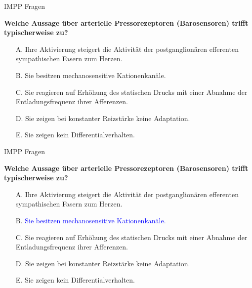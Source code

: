 \documentclass{beamer}
\begin{document}












\begin{frame}{IMPP Fragen}


\textbf{Welche Aussage über arterielle Pressorezeptoren (Barosensoren) trifft typischerweise zu?} \\[0.2 cm]

\begin{itemize}
\item[A.] Ihre Aktivierung steigert die Aktivität der postganglionären efferenten sympathischen Fasern zum Herzen.
\item[B.] Sie besitzen mechanosensitive Kationenkanäle. %
\item[C.] Sie reagieren auf Erhöhung des statischen Drucks mit einer Abnahme der Entladungsfrequenz ihrer Afferenzen.
\item[D.] Sie zeigen bei konstanter Reizstärke keine Adaptation.
\item[E.] Sie zeigen kein Differentialverhalten.

\end{itemize}


\end{frame}


\begin{frame}{IMPP Fragen}


\textbf{Welche Aussage über arterielle Pressorezeptoren (Barosensoren) trifft typischerweise zu?} \\[0.2 cm]

\begin{itemize}
\item[A.] Ihre Aktivierung steigert die Aktivität der postganglionären efferenten sympathischen Fasern zum Herzen.
\item[B.] \textcolor{blue}{Sie besitzen mechanosensitive Kationenkanäle.} %
\item[C.] Sie reagieren auf Erhöhung des statischen Drucks mit einer Abnahme der Entladungsfrequenz ihrer Afferenzen.
\item[D.] Sie zeigen bei konstanter Reizstärke keine Adaptation.
\item[E.] Sie zeigen kein Differentialverhalten.

\end{itemize}


\end{frame}
\end{document}
